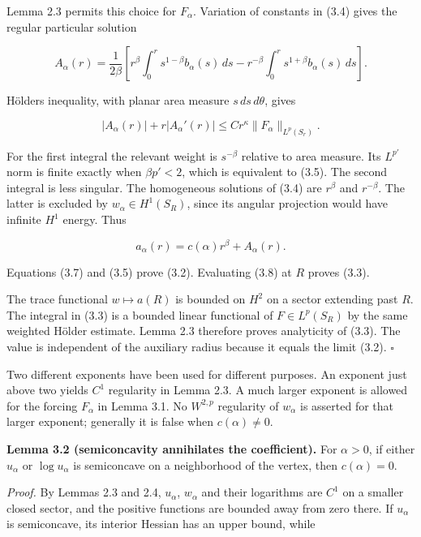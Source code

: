 \documentclass[11pt]{article}
\begin{document}
Lemma 2.3 permits this choice for \(F_\alpha\). Variation of constants
in (3.4) gives the regular particular solution

\[
A_\alpha(r)=\frac1{2\beta}\left[
r^\beta\int_0^r s^{1-\beta}b_\alpha(s)\,ds
-r^{-\beta}\int_0^r s^{1+\beta}b_\alpha(s)\,ds\right].
\tag{3.6}
\]

Hölder\textquotesingle s inequality, with planar area measure
\(s\,ds\,d\theta\), gives

\[
|A_\alpha(r)|+r|A_\alpha'(r)|
\le C r^\kappa\|F_\alpha\|_{L^p(S_r)}.
\tag{3.7}
\]

For the first integral the relevant weight is \(s^{-\beta}\) relative to
area measure. Its \(L^{p'}\) norm is finite exactly when \(\beta p'<2\),
which is equivalent to (3.5). The second integral is less singular. The
homogeneous solutions of (3.4) are \(r^\beta\) and \(r^{-\beta}\). The
latter is excluded by \(w_\alpha\in H^1(S_R)\), since its angular
projection would have infinite \(H^1\) energy. Thus

\[
a_\alpha(r)=c(\alpha)r^\beta+A_\alpha(r).
\tag{3.8}
\]

Equations (3.7) and (3.5) prove (3.2). Evaluating (3.8) at \(R\) proves
(3.3).

The trace functional \(w\mapsto a(R)\) is bounded on \(H^2\) on a sector
extending past \(R\). The integral in (3.3) is a bounded linear
functional of \(F\in L^p(S_R)\) by the same weighted Hölder estimate.
Lemma 2.3 therefore proves analyticity of (3.3). The value is
independent of the auxiliary radius because it equals the limit (3.2). \(\square\)

Two different exponents have been used for different purposes. An
exponent just above two yields \(C^1\) regularity in Lemma 2.3. A much
larger exponent is allowed for the forcing \(F_\alpha\) in Lemma 3.1. No
\(W^{2,p}\) regularity of \(w_\alpha\) is asserted for that larger
exponent; generally it is false when \(c(\alpha)\ne0\).

\textbf{Lemma 3.2 (semiconcavity annihilates the coefficient).} For
\(\alpha>0\), if either \(u_\alpha\) or \(\log u_\alpha\) is semiconcave
on a neighborhood of the vertex, then \(c(\alpha)=0\).

\emph{Proof.} By Lemmas 2.3 and 2.4, \(u_\alpha\), \(w_\alpha\) and
their logarithms are \(C^1\) on a smaller closed sector, and the
positive functions are bounded away from zero there. If \(u_\alpha\) is
semiconcave, its interior Hessian has an upper bound, while
\end{document}
